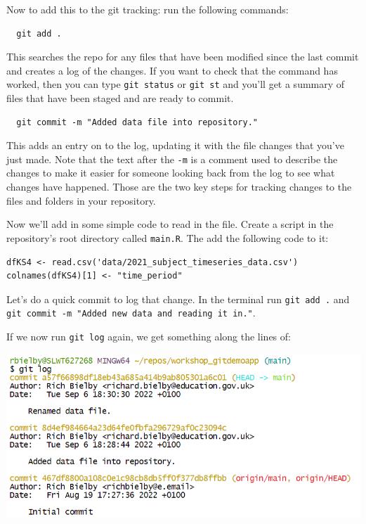 \documentclass[
  12pt,
]{article}
\begin{document}
Now to add this to the git tracking: run the following commands:

\begin{verbatim}
  git add .
\end{verbatim}

This searches the repo for any files that have been modified since the
last commit and creates a log of the changes. If you want to check that
the command has worked, then you can type \texttt{git\ status} or
\texttt{git\ st} and you'll get a summary of files that have been staged
and are ready to commit.

\begin{verbatim}
  git commit -m "Added data file into repository."
\end{verbatim}

This adds an entry on to the log, updating it with the file changes that
you've just made. Note that the text after the \texttt{-m} is a comment
used to describe the changes to make it easier for someone looking back
from the log to see what changes have happened. Those are the two key
steps for tracking changes to the files and folders in your repository.

Now we'll add in some simple code to read in the file. Create a script
in the repository's root directory called \texttt{main.R}. The add the
following code to it:

\begin{verbatim}
dfKS4 <- read.csv('data/2021_subject_timeseries_data.csv')
colnames(dfKS4)[1] <- "time_period"
\end{verbatim}

Let's do a quick commit to log that change. In the terminal run
\texttt{git\ add\ .} and
\texttt{git\ commit\ -m\ "Added\ new\ data\ and\ reading\ it\ in."}.

If we now run \texttt{git\ log} again, we get something along the lines
of:

\begin{center}\includegraphics[width=0.8\linewidth]{images/gitdemo/gitdemo-gitlog-2} \end{center}
\end{document}
